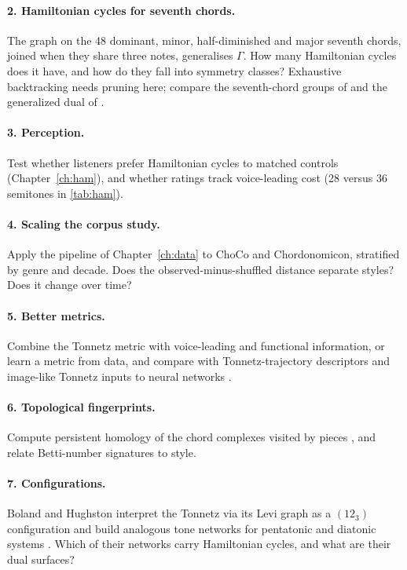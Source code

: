 \paragraph{2. Hamiltonian cycles for seventh chords.} The graph on the 48 dominant, minor, half-diminished and
major seventh chords, joined when they share three notes, generalises $\Gamma$. How many Hamiltonian cycles does it
have, and how do they fall into symmetry classes? Exhaustive backtracking needs pruning here; compare the seventh-chord
groups of \citep{cannas2017} and the generalized dual of \citep{cannas2018}.

\paragraph{3. Perception.} Test whether listeners prefer Hamiltonian cycles to matched controls (Chapter~\ref{ch:ham}),
and whether ratings track voice-leading cost (28 versus 36 semitones in \cref{tab:ham}).

\paragraph{4. Scaling the corpus study.} Apply the pipeline of Chapter~\ref{ch:data} to ChoCo and Chordonomicon,
stratified by genre and decade. Does the observed-minus-shuffled distance separate styles? Does it change over time?

\paragraph{5. Better metrics.} Combine the Tonnetz metric with voice-leading and functional information, or learn a
metric from data, and compare with Tonnetz-trajectory descriptors \citep{karystinaios2020} and image-like Tonnetz
inputs to neural networks \citep{chuan2018}.

\paragraph{6. Topological fingerprints.} Compute persistent homology of the chord complexes visited by pieces
\citep{bergomi2016}, and relate Betti-number signatures to style.

\paragraph{7. Configurations.} Boland and Hughston interpret the Tonnetz via its Levi graph as a $(12_3)$
configuration and build analogous tone networks for pentatonic and diatonic systems \citep{boland2025,boland2026}.
Which of their networks carry Hamiltonian cycles, and what are their dual surfaces?

